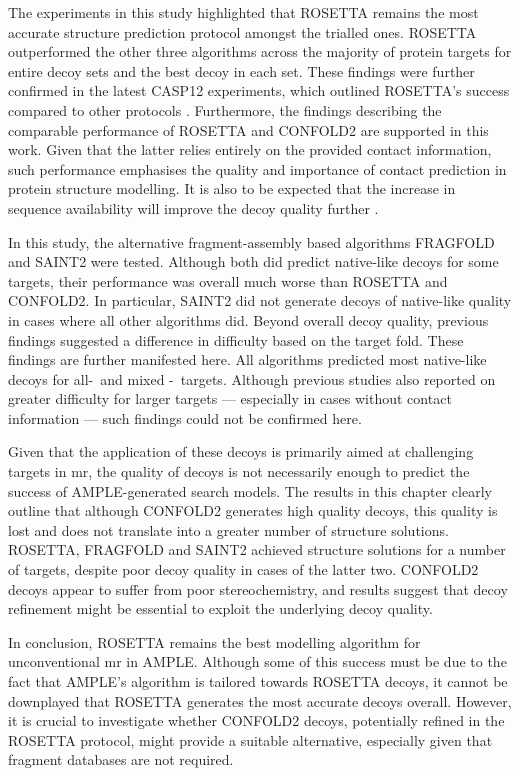 The experiments in this study highlighted that ROSETTA remains the most accurate structure prediction protocol amongst the trialled ones. ROSETTA outperformed the other three algorithms across the majority of protein targets for entire decoy sets and the best decoy in each set. These findings were further confirmed in the latest CASP12 experiments, which outlined ROSETTA's success compared to other protocols \cite{Ovchinnikov2017-wp,Abriata2018-lu}. Furthermore, the findings describing the comparable performance of ROSETTA and CONFOLD2 \cite{Adhikari2018-lj,Michel2017-xh} are supported in this work. Given that the latter relies entirely on the provided contact information, such performance emphasises the quality and importance of contact prediction in protein structure modelling. It is also to be expected that the increase in sequence availability will improve the decoy quality further \cite{Abriata2018-lu,Schaarschmidt2018-mh}.

In this study, the alternative fragment-assembly based algorithms FRAGFOLD and SAINT2 were tested. Although both did predict native-like decoys for some targets, their performance was overall much worse than ROSETTA and CONFOLD2. In particular, SAINT2 did not generate decoys of native-like quality in cases where all other algorithms did. Beyond overall decoy quality, previous findings suggested a difference in difficulty based on the target fold. These findings are further manifested here. All algorithms predicted most native-like decoys for all-\textalpha\ and mixed \textalpha-\textbeta\ targets. Although previous studies also reported on greater difficulty for larger targets --- especially in cases without contact information --- such findings could not be confirmed here.

Given that the application of these decoys is primarily aimed at challenging targets in \gls{mr}, the quality of decoys is not necessarily enough to predict the success of AMPLE-generated search models. The results in this chapter clearly outline that although CONFOLD2 generates high quality decoys, this quality is lost and does not translate into a greater number of structure solutions. ROSETTA, FRAGFOLD and SAINT2 achieved structure solutions for a number of targets, despite poor decoy quality in cases of the latter two. CONFOLD2 decoys appear to suffer from poor stereochemistry, and results suggest that decoy refinement might be essential to exploit the underlying decoy quality.

In conclusion, ROSETTA remains the best modelling algorithm for unconventional \gls{mr} in AMPLE. Although some of this success must be due to the fact that AMPLE's algorithm is tailored towards ROSETTA decoys, it cannot be downplayed that ROSETTA generates the most accurate decoys overall. However, it is crucial to investigate whether CONFOLD2 decoys, potentially refined in the ROSETTA protocol, might provide a suitable alternative, especially given that fragment databases are not required.

